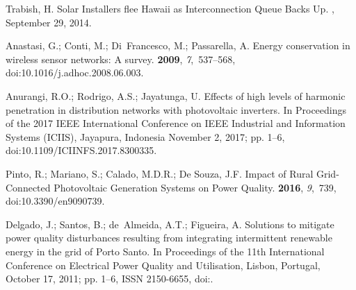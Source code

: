 \documentclass[energies,article,accept,moreauthors,pdftex]{Definitions/mdpi}
\begin{document}






\begin{thebibliography}{999}
\providecommand{\natexlab}[1]{#1}



Trabish, H.
\newblock Solar Installers flee {Hawaii} as Interconnection Queue Backs Up.
, {September 29, 2014}.

Anastasi, G.; Conti, M.; Di~Francesco, M.; Passarella, A.
\newblock Energy conservation in wireless sensor networks: {A} survey.
 {\bf 2009}, {\em 7},~537--568, doi:10.1016/j.adhoc.2008.06.003.

Anurangi, R.O.; Rodrigo, A.S.; Jayatunga, U.
\newblock Effects of high levels of harmonic penetration in distribution
networks with photovoltaic inverters.
\newblock In {Proceedings of the } 2017 {IEEE} {International} {Conference} on IEEE Industrial and {Information} {Systems} ({ICIIS}), Jayapura, Indonesia November 2, 2017; pp. 1--6, doi:10.1109/ICIINFS.2017.8300335.

Pinto, R.; Mariano, S.; Calado, M.D.R.;  De Souza, J.F.
\newblock Impact of {Rural} {Grid}-{Connected} {Photovoltaic} {Generation}
{Systems} on {Power} {Quality}.
 {\bf 2016}, {\em 9},~739, doi:10.3390/en9090739.

Delgado, J.; Santos, B.; de~Almeida, A.T.; Figueira, A.
\newblock Solutions to mitigate power quality disturbances resulting from
integrating intermittent renewable energy in the grid of {Porto} {Santo}.
\newblock In {Proceedings of the } 11th {International} {Conference} on {Electrical} {Power} {Quality}
and {Utilisation}, Lisbon, Portugal, October 17, 2011; pp. 1--6,
\newblock ISSN 2150-6655,
doi:{\href{https://doi.org/10.1109/EPQU.2011.6128870}{}}.


\end{thebibliography}
\end{document}
